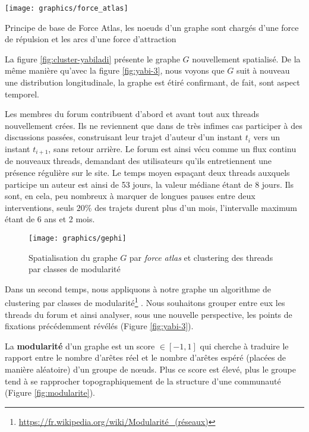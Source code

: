 \documentclass[symmetric,justified,marginals=raggedouter]{tufte-book}
\begin{document}
\begin{marginfigure}%
  \texttt{[image: graphics/force\_atlas]}
  \vspace*{0.2cm}  
  \caption{Principe de base de Force Atlas, les noeuds d'un graphe sont chargés d'une force de répulsion et les arcs d'une force d'attraction}
  \label{fig:force_atlas}
\end{marginfigure} 

La figure \ref{fig:cluster-yabiladi} présente le graphe $G$ nouvellement spatialisé. De la même manière qu'avec la figure \ref{fig:yabi-3}, nous voyons que $G$ suit à nouveau une distribution longitudinale, la graphe est étiré confirmant, de fait, sont aspect temporel. 

Les membres du forum contribuent d'abord et avant tout aux threads nouvellement crées. Ils ne reviennent que dans de très infimes cas participer à des discussions passées, construisant leur trajet d'auteur d'un instant $t_i$ vers un instant $t_{i+1}$, sans retour arrière. Le forum est ainsi vécu comme un flux continu de nouveaux threads, demandant des utilisateurs qu'ils entretiennent une présence régulière sur le site. Le temps moyen espaçant deux threads auxquels participe un auteur est ainsi de 53 jours, la valeur médiane étant de 8 jours. Ils sont, en cela, peu nombreux à marquer de longues pauses entre deux interventions, seuls $20\%$ des trajets durent plus d'un mois, l'intervalle maximum étant de 6 ans et 2 mois.   

\begin{figure*}
  \texttt{[image: graphics/gephi]}
  \caption{Spatialisation du graphe $G$ par \textit{force atlas} et clustering des threads par classes de modularité}
  \label{fig:gephi}
\end{figure*} 

\noindent Dans un second temps, nous appliquons à notre graphe un algorithme de clustering par classes de modularité\footnote{\url{https://fr.wikipedia.org/wiki/Modularité\_(réseaux)}} \citep{blondel_fast_2008}. Nous souhaitons grouper entre eux les threads du forum et ainsi analyser, sous une nouvelle perspective, les points de fixations précédemment révélés (Figure \ref{fig:yabi-3}). 

La \textbf{modularité} d'un graphe est un score $\in [-1,1]$ qui cherche à traduire le rapport entre le nombre d'arêtes réel et le nombre d'arêtes espéré (placées de manière aléatoire) d'un groupe de nœuds. Plus ce score est élevé, plus le groupe tend à se rapprocher topographiquement de la structure d'une communauté (Figure \ref{fig:modularite}).
\end{document}
